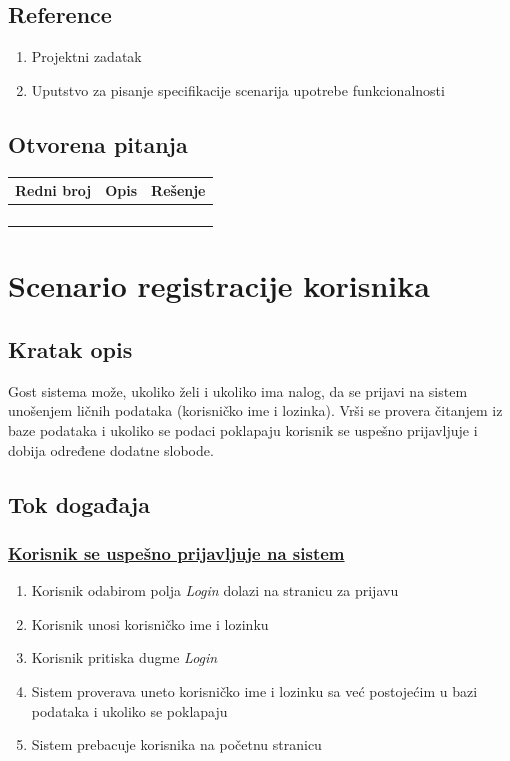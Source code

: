 \documentclass[11pt,a4paper]{article}
\begin{document}
\subsection{Reference}
\begin{enumerate}
    \item Projektni zadatak
    \item Uputstvo za pisanje specifikacije scenarija upotrebe funkcionalnosti
\end{enumerate}
\subsection{Otvorena pitanja}
\begin{center}
\begin{tabular}{| >{\centering\arraybackslash}m{1.9cm} | >{\centering\arraybackslash}m{4.9cm} | >{\centering\arraybackslash}m{4.9cm} |}
\hline
\rowcolor[HTML]{000000} 
{\color[HTML]{FFFFFF} Redni broj } & {\color[HTML]{FFFFFF} Opis } & {\color[HTML]{FFFFFF} Rešenje } \\ \hline
 &  &  \\ \hline
 &  &  \\ \hline
 &  &  \\ \hline
 &  &  \\ \hline
\end{tabular}
\end{center}

\newpage

\section{Scenario registracije korisnika}
\subsection{Kratak opis}
Gost sistema može, ukoliko želi i ukoliko ima nalog, da se prijavi na sistem unošenjem ličnih
podataka (korisničko ime i lozinka). Vrši se provera čitanjem iz baze podataka i ukoliko se podaci poklapaju korisnik se uspešno prijavljuje i dobija određene dodatne slobode.
\subsection{Tok događaja}
\subsubsection{\underline{Korisnik se uspešno prijavljuje na sistem}}
\begin{enumerate}
    \item Korisnik odabirom polja \textit{Login} dolazi na stranicu za prijavu
    \item Korisnik unosi korisničko ime i lozinku
    \item Korisnik pritiska dugme \textit{Login}
    \item Sistem proverava uneto korisničko ime i lozinku sa već postojećim u bazi podataka i ukoliko se poklapaju
    \item Sistem prebacuje korisnika na početnu stranicu
\end{enumerate}
\end{document}
